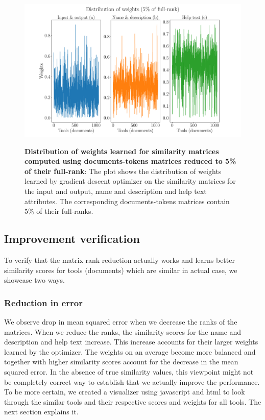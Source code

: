 \begin{figure}[h]
\begin{centering}
    {\includegraphics[scale=0.35]{figures/Weights_005.pdf}}
    \caption[Distribution of weights learned for similarity matrices computed using documents-tokens matrices reduced to 5\% of their full-rank]{\textbf{Distribution of weights learned for similarity matrices computed using documents-tokens matrices reduced to 5\% of their full-rank}: The plot shows the distribution of weights learned by gradient descent optimizer on the similarity matrices for the input and output, name and description and help text attributes. The corresponding documents-tokens matrices contain 5\% of their full-ranks.}
\end{centering}
\end{figure}

\subsection{Improvement verification}
To verify that the matrix rank reduction actually works and learns better similarity scores for tools (documents) which are similar in actual case, we showcase two ways.

\subsubsection{Reduction in error}
We observe drop in mean squared error when we decrease the ranks of the matrices. When we reduce the ranks, the similarity scores for the name and description and help text increase. This increase accounts for their larger weights learned by the optimizer. The weights on an average become more balanced and together with higher similarity scores account for the decrease in the mean squared error. In the absence of true similarity values, this viewpoint might not be completely correct way to establish that we actually improve the performance. To be more certain, we created a visualizer using javascript and html to look through the similar tools and their respective scores and weights for all tools. The next section explains it.

